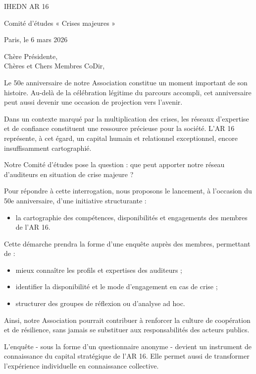 \documentclass[12pt,a4paper]{article}
\begin{document}
\begin{tcolorbox}[
breakable,
colback=gray!5,
colframe=black,
boxrule=0.5pt,
arc=3mm
]
\setlength{\parskip}{0.5em}
IHEDN AR 16

Comité d'études « Crises majeures »

\hfill Paris, le 6 mars 2026

Chère Présidente,\\
Chères et Chers Membres CoDir,

Le 50e anniversaire de notre Association constitue un moment important de son histoire. Au-delà de la célébration légitime du parcours accompli, cet anniversaire peut aussi devenir une occasion de projection vers l'avenir.

Dans un contexte marqué par la multiplication des crises, les réseaux d'expertise et de confiance constituent une ressource précieuse pour la société. L'AR 16 représente, à cet égard, un capital humain et relationnel exceptionnel, encore insuffisamment cartographié.

Notre Comité d'études pose la question : que peut apporter notre réseau d'auditeurs en situation de crise majeure ?

Pour répondre à cette interrogation, nous proposons le lancement, à l'occasion du 50e anniversaire, d'une initiative structurante :

\begin{itemize}
    \item la cartographie des compétences, disponibilités et engagements des membres de l'AR 16.
\end{itemize}

Cette démarche prendra la forme d'une enquête auprès des membres, permettant de :

\begin{itemize}
    \item mieux connaître les profils et expertises des auditeurs ;
    \item identifier la disponibilité et le mode d'engagement en cas de crise ;
    \item structurer des groupes de réflexion ou d'analyse ad hoc.
\end{itemize}

Ainsi, notre Association pourrait contribuer à renforcer la culture de coopération et de résilience, sans jamais se substituer aux responsabilités des acteurs publics.

L'enquête - sous la forme d'un questionnaire anonyme - devient un instrument de connaissance du capital stratégique de l'AR 16. Elle permet aussi de transformer l'expérience individuelle en connaissance collective.


\end{tcolorbox}
\end{document}
